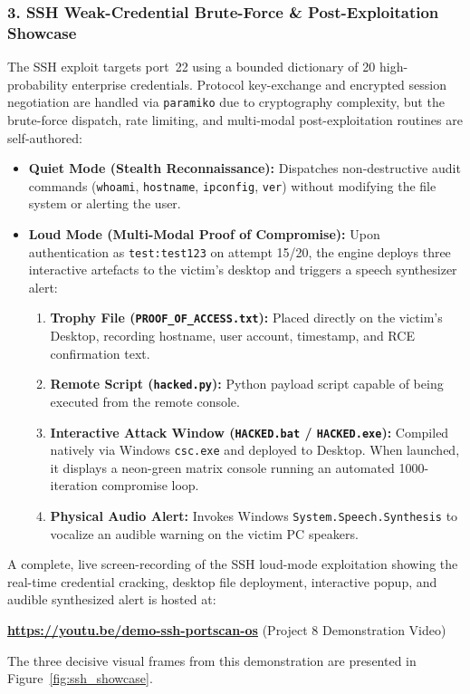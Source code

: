 \subsubsection{3. SSH Weak-Credential Brute-Force \& Post-Exploitation Showcase}
The SSH exploit targets port~22 using a bounded dictionary of 20 high-probability enterprise
credentials. Protocol key-exchange and encrypted session negotiation are handled via \texttt{paramiko}
due to cryptography complexity, but the brute-force dispatch, rate limiting, and multi-modal
post-exploitation routines are self-authored:
\begin{itemize}
    \item \textbf{Quiet Mode (Stealth Reconnaissance):} Dispatches non-destructive audit commands
    (\texttt{whoami}, \texttt{hostname}, \texttt{ipconfig}, \texttt{ver}) without modifying the file
    system or alerting the user.
    \item \textbf{Loud Mode (Multi-Modal Proof of Compromise):} Upon authentication as
    \texttt{test:test123} on attempt 15/20, the engine deploys three interactive artefacts to the
    victim's desktop and triggers a speech synthesizer alert:
    \begin{enumerate}
        \item \textbf{Trophy File (\texttt{PROOF\_OF\_ACCESS.txt}):} Placed directly on the victim's
        Desktop, recording hostname, user account, timestamp, and RCE confirmation text.
        \item \textbf{Remote Script (\texttt{hacked.py}):} Python payload script capable of being
        executed from the remote console.
        \item \textbf{Interactive Attack Window (\texttt{HACKED.bat} / \texttt{HACKED.exe}):} Compiled
        natively via Windows \texttt{csc.exe} and deployed to Desktop. When launched, it displays a
        neon-green matrix console running an automated 1000-iteration compromise loop.
        \item \textbf{Physical Audio Alert:} Invokes Windows \texttt{System.Speech.Synthesis} to vocalize
        an audible warning on the victim PC speakers.
    \end{enumerate}
\end{itemize}

\begin{keypoint}
A complete, live screen-recording of the SSH loud-mode exploitation showing the real-time credential
cracking, desktop file deployment, interactive popup, and audible synthesized alert is hosted at:
\begin{center}
\textbf{\url{https://youtu.be/demo-ssh-portscan-os}} \quad \textsf{(Project 8 Demonstration Video)}
\end{center}
The three decisive visual frames from this demonstration are presented in Figure~\ref{fig:ssh_showcase}.
\end{keypoint}

